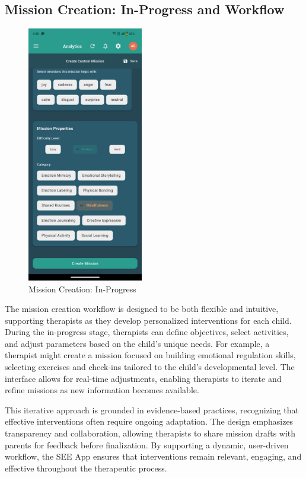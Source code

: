 \documentclass[12pt,a4paper]{article}
\newcommand{\sectiontitle}[1]{\subsection{#1}}
\begin{document}
\sectiontitle{Mission Creation: In-Progress and Workflow}

\begin{figure}[H]
    \centering
    \includegraphics[width=0.45\textwidth]{Screenshots/middleofmissioncreation.png}
    \caption{Mission Creation: In-Progress}
    \label{fig:middle-mission-creation}
\end{figure}
The mission creation workflow is designed to be both flexible and intuitive, supporting therapists as they develop personalized interventions for each child. During the in-progress stage, therapists can define objectives, select activities, and adjust parameters based on the child's unique needs. For example, a therapist might create a mission focused on building emotional regulation skills, selecting exercises and check-ins tailored to the child's developmental level. The interface allows for real-time adjustments, enabling therapists to iterate and refine missions as new information becomes available.

This iterative approach is grounded in evidence-based practices, recognizing that effective interventions often require ongoing adaptation. The design emphasizes transparency and collaboration, allowing therapists to share mission drafts with parents for feedback before finalization. By supporting a dynamic, user-driven workflow, the SEE App ensures that interventions remain relevant, engaging, and effective throughout the therapeutic process.
\end{document}
